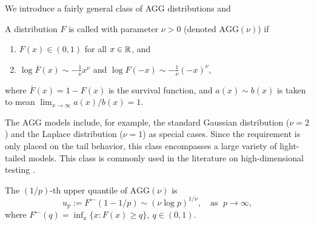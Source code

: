 
We introduce a fairly general class of \ac{AGG} distributions and 

\begin{definition} \label{def:AGG}
A distribution $F$ is called  
with parameter $\nu>0$ (denoted $\text{AGG}(\nu)$) if
\begin{enumerate}
    \item $F(x)\in(0,1)$ for all $x\in\mathbb R$, and \smallskip
    \item $\log{\overline{F}(x)} \sim -\frac{1}{\nu}x^\nu$ and $\log{F(-x)} \sim -\frac{1}{\nu}(-x)^\nu,$ \label{eq:AGG}
\end{enumerate}
where $\overline{F}(x) = 1 - F(x)$ is the survival function, and $a(x)\sim b(x)$ is taken to mean $\lim_{x\to\infty} a(x)/b(x) = 1$.
\end{definition}

The AGG models include, for example, the standard Gaussian distribution ($\nu = 2$) and the Laplace distribution ($\nu = 1$) as special cases. 
Since the requirement is only placed on the tail behavior, this class encompasses a large variety of light-tailed models. 
This class is commonly used in the literature on high-dimensional testing
 \citep{cai2007estimation, arias2017distribution}.



\begin{proposition} \label{prop:quantile}
The $(1/p)$-th upper quantile of $\text{AGG}(\nu)$ is
\begin{equation} \label{eq:AGG-quantiles}
    u_{p} := F^\leftarrow(1-1/p) \sim \left(\nu\log{p}\right)^{1/\nu},\quad \text{as }\;p\to\infty,
\end{equation}
where $F^\leftarrow(q) = \inf_x\{x:F(x)\ge q\},\ q\in (0,1)$.
\end{proposition}


